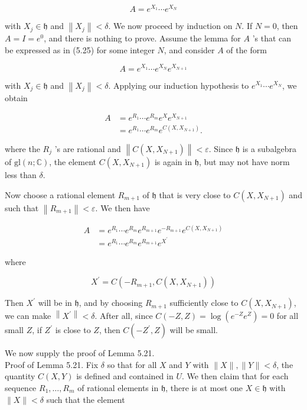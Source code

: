 \documentclass[10pt, letterpaper]{article}
\begin{document}
$$
A=e^{X_{1}} \cdots e^{X_{N}}
$$

with $X_{j} \in \mathfrak{h}$ and $\left\|X_{j}\right\|<\delta$. We now proceed by induction on $N$. If $N=0$, then $A=I=e^{0}$, and there is nothing to prove. Assume the lemma for $A$ 's that can be expressed as in (5.25) for some integer $N$, and consider $A$ of the form

$$
A=e^{X_{1}} \cdots e^{X_{N}} e^{X_{N+1}}
$$

with $X_{j} \in \mathfrak{h}$ and $\left\|X_{j}\right\|<\delta$. Applying our induction hypothesis to $e^{X_{1}} \cdots e^{X_{N}}$, we obtain

$$
\begin{aligned}
A & =e^{R_{1}} \cdots e^{R_{m}} e^{X} e^{X_{N+1}} \\
& =e^{R_{1}} \cdots e^{R_{m}} e^{C\left(X, X_{N+1}\right)} .
\end{aligned}
$$

where the $R_{j}$ 's are rational and $\left\|C\left(X, X_{N+1}\right)\right\|<\varepsilon$. Since $\mathfrak{h}$ is a subalgebra of $\mathrm{gl}(n ; \mathbb{C})$, the element $C\left(X, X_{N+1}\right)$ is again in $\mathfrak{h}$, but may not have norm less than $\delta$.

Now choose a rational element $R_{m+1}$ of $\mathfrak{h}$ that is very close to $C\left(X, X_{N+1}\right)$ and such that $\left\|R_{m+1}\right\|<\varepsilon$. We then have

$$
\begin{aligned}
A & =e^{R_{1}} \cdots e^{R_{m}} e^{R_{m+1}} e^{-R_{m+1}} e^{C\left(X, X_{N+1}\right)} \\
& =e^{R_{1}} \cdots e^{R_{m}} e^{R_{m+1}} e^{X^{\prime}}
\end{aligned}
$$

where

$$
X^{\prime}=C\left(-R_{m+1}, C\left(X, X_{N+1}\right)\right)
$$

Then $X^{\prime}$ will be in $\mathfrak{h}$, and by choosing $R_{m+1}$ sufficiently close to $C\left(X, X_{N+1}\right)$, we can make $\left\|X^{\prime}\right\|<\delta$. After all, since $C(-Z, Z)=\log \left(e^{-Z} e^{Z}\right)=0$ for all small $Z$, if $Z^{\prime}$ is close to $Z$, then $C\left(-Z^{\prime}, Z\right)$ will be small.

We now supply the proof of Lemma 5.21.\\
Proof of Lemma 5.21. Fix $\delta$ so that for all $X$ and $Y$ with $\|X\|,\|Y\|<\delta$, the quantity $C(X, Y)$ is defined and contained in $U$. We then claim that for each sequence $R_{1}, \ldots, R_{m}$ of rational elements in $\mathfrak{h}$, there is at most one $X \in \mathfrak{h}$ with $\|X\|<\delta$ such that the element
\end{document}
